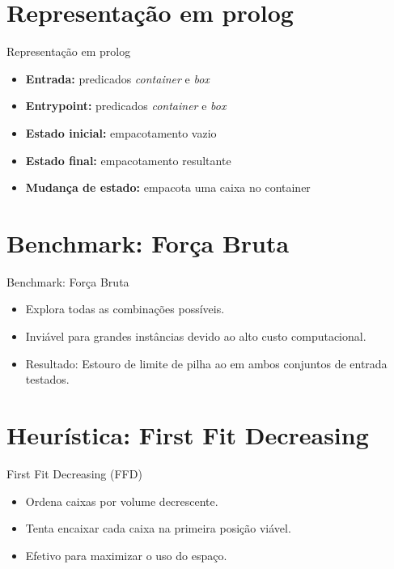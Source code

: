\documentclass{beamer}
\begin{document}
\section{Representação em prolog}
\begin{frame}{Representação em prolog}

	\begin{itemize}
		\item \textbf{Entrada:} predicados \emph{container} e \emph{box}
		\item \textbf{Entrypoint:} predicados \emph{container} e \emph{box}
		\item \textbf{Estado inicial:} empacotamento vazio
		\item \textbf{Estado final:} empacotamento resultante
		\item \textbf{Mudança de estado:} empacota uma caixa no container
	\end{itemize}
\end{frame}

\section{Benchmark: Força Bruta}
\begin{frame}{Benchmark: Força Bruta}
	\begin{itemize}
		\item Explora todas as combinações possíveis.
		\item Inviável para grandes instâncias devido ao alto custo computacional.
		\item Resultado: Estouro de limite de pilha ao em ambos conjuntos de entrada testados.
	\end{itemize}
\end{frame}

\section{Heurística: First Fit Decreasing}
\begin{frame}{First Fit Decreasing (FFD)}
	\begin{itemize}
		\item Ordena caixas por volume decrescente.
		\item Tenta encaixar cada caixa na primeira posição viável.
		\item Efetivo para maximizar o uso do espaço.
	\end{itemize}
\end{frame}
\end{document}

